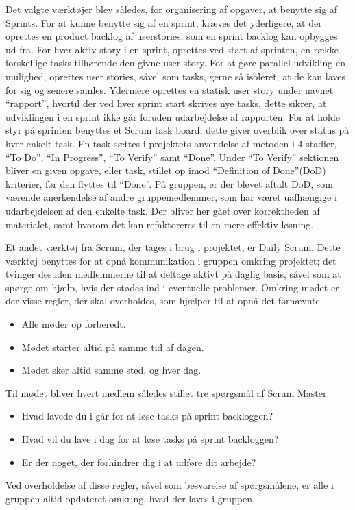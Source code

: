 Det valgte værktøjer blev således, for organisering af opgaver, at benytte sig af Sprints.
For at kunne benytte sig af en sprint, kræves det yderligere, at der oprettes en product backlog af userstories, som en sprint backlog kan opbygges ud fra.
For hver aktiv story i en sprint, oprettes ved start af sprinten, en række forskellige tasks tilhørende den givne user story.
For at gøre parallel udvikling en mulighed, oprettes user stories, såvel som tasks, gerne så isoleret, at de kan laves for sig og senere samles.
Ydermere oprettes en statisk user story under navnet ``rapport'', hvortil der ved hver sprint start skrives nye tasks, dette sikrer, at udviklingen i en sprint ikke går foruden udarbejdelse af rapporten.
For at holde styr på sprinten benyttes et Scrum task board, dette giver overblik over status på hver enkelt task.
En task sættes i projektets anvendelse af metoden i 4 stadier, ``To Do'', ``In Progress'', ``To Verify'' samt ``Done''.
Under ``To Verify'' sektionen bliver en given opgave, eller task, stillet op imod ``Definition of Done''(DoD) kriterier, før den flyttes til ``Done''.
På gruppen, er der blevet aftalt DoD, som værende anerkendelse af andre gruppemedlemmer, som har været uafhængige i udarbejdelsen af den enkelte task.
Der bliver her gået over korrektheden af materialet, samt hvorom det kan refaktoreres til en mere effektiv løsning.

Et andet værktøj fra Scrum, der tages i brug i projektet, er Daily Scrum.
Dette værktøj benyttes for at opnå kommunikation i gruppen omkring projektet; det tvinger desuden medlemmerne til at deltage aktivt på daglig basis, såvel som at spørge om hjælp, hvis der stødes ind i eventuelle problemer.
Omkring mødet er der visse regler, der skal overholdes, som hjælper til at opnå det førnævnte.
\begin{itemize}
  \item Alle møder op forberedt.
  \item Mødet starter altid på samme tid af dagen.
  \item Mødet sker altid samme sted, og hver dag.
\end{itemize}
Til mødet bliver hvert medlem således stillet tre spørgsmål af Scrum Master.
\begin{itemize}
  \item Hvad lavede du i går for at løse tasks på sprint backloggen?
  \item Hvad vil du lave i dag for at løse tasks på sprint backloggen?
  \item Er der noget, der forhindrer dig i at udføre dit arbejde?
\end{itemize}
Ved overholdelse af disse regler, såvel som besvarelse af spørgsmålene, er alle i gruppen altid opdateret omkring, hvad der laves i gruppen.


